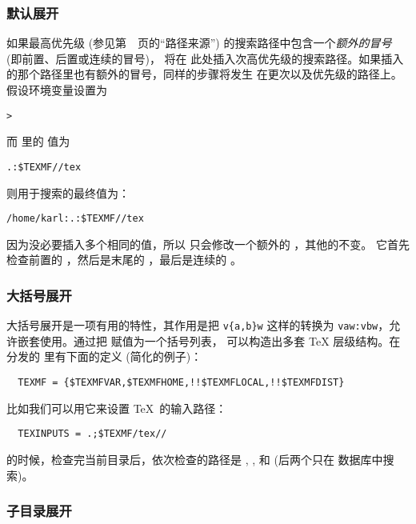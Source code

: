\documentclass{article}
\begin{document}
\subsubsection{默认展开}
\label{sec:default-expansion}

如果最高优先级 (参见第~\pageref{sec:path-sources}~页的``路径来源'')
的搜索路径中包含一个\emph{额外的冒号} (即前置、后置或连续的冒号)，\KPS{} 将在
此处插入次高优先级的搜索路径。如果插入的那个路径里也有额外的冒号，同样的步骤将发生
在更次以及优先级的路径上。假设环境变量设置为

\begin{alltt}
> 
\end{alltt}

而  里的  值为

\begin{alltt}
  .:\$TEXMF//tex
\end{alltt}

则用于搜索的最终值为：

\begin{alltt}
  /home/karl:.:\$TEXMF//tex
\end{alltt}

因为没必要插入多个相同的值，所以 \KPS{} 只会修改一个额外的 \samp{:}，其他的不变。
它首先检查前置的 \samp{:}，然后是末尾的 \samp{:}，最后是连续的 \samp{:}。

\subsubsection{大括号展开}
\label{sec:brace-expansion}

大括号展开是一项有用的特性，其作用是把 \verb+v{a,b}w+ 这样的转换为
\verb+vaw:vbw+，允许嵌套使用。通过把  赋值为一个括号列表，
可以构造出多套 \TeX{} 层级结构。在分发的  里有下面的定义
(简化的例子)：
\begin{verbatim}
  TEXMF = {$TEXMFVAR,$TEXMFHOME,!!$TEXMFLOCAL,!!$TEXMFDIST}
\end{verbatim}
比如我们可以用它来设置 \TeX\ 的输入路径：
\begin{verbatim}
  TEXINPUTS = .;$TEXMF/tex//
\end{verbatim}
的时候，检查完当前目录后，依次检查的路径是
, , 
和  (后两个只在  数据库中搜索)。

\subsubsection{子目录展开}
\label{sec:subdirectory-expansion}
\end{document}
